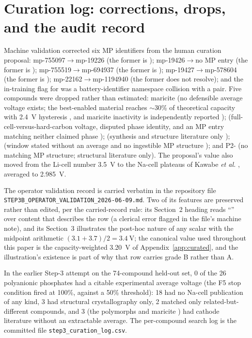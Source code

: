 \documentclass[reprint,aps,prb,amsmath,amssymb,nofootinbib,longbibliography]{revtex4-2}
\begin{document}
\section{Curation log: corrections, drops, and the audit record}
\label{app:curation}

Machine validation corrected six MP identifiers from the human curation
proposal:  mp-755097$\to$mp-19226 (the former is
);  mp-19426$\to$no MP entry (the former is
);  mp-755519$\to$mp-694937 (the former is
);  mp-19427$\to$mp-578604 (the former is
);  mp-22162$\to$mp-1194940 (the former does
not resolve); and the in-training flag for  was a
battery-identifier namespace collision with a  pair. Five
compounds were dropped rather than estimated: maricite  (no
defensible average voltage exists; the best-enabled material reaches
$\sim$30\% of theoretical capacity with \SI{2.4}{\volt} hysteresis
\cite{mohsin2023}, and maricite inactivity is independently reported
\cite{chiring2021});  (full-cell-versus-hard-carbon voltage,
disputed phase identity, and an MP entry matching neither claimed phase
\cite{barker2003});  (synthesis and structure literature only
\cite{tripathi2010});  (window stated without an
average and no ingestible MP structure \cite{komaba2012}); and
P2- (no matching MP structure; structural literature
only). The proposal's  value also moved from the Li-cell
number \SI{3.5}{\volt} \cite{ellis2007} to the Na-cell plateaus of Kawabe
\emph{et al.} \cite{kawabe2011}, averaged to \SI{2.985}{\volt}.

The operator validation record is carried verbatim in the repository file
\texttt{STEP3B\_OPERATOR\_VALIDATION\_2026-06-09.md}. Two of its features
are preserved rather than edited, per the carried-record rule: its Section~2
heading reads ``'' over content that describes the
 row (a clerical error flagged in the file's machine note),
and its Section~3 illustrates the post-hoc nature of any  scalar
with the midpoint arithmetic $(3.1+3.7)/2=\SI{3.4}{\volt}$; the canonical
value used throughout this paper is the capacity-weighted \SI{3.20}{\volt}
of Appendix~\ref{app:curated}, and the illustration's existence is part of
why that row carries grade B rather than A.

In the earlier Step-3 attempt on the 74-compound held-out set, 0 of the 26
polyanionic phosphates had a citable experimental average voltage (the F5
stop condition fired at 100\%, against a 50\% threshold): 18 had no Na-cell
publication of any kind, 3 had structural crystallography only, 2 matched
only related-but-different compounds, and 3 (the  polymorphs and
maricite ) had cathode literature without an extractable
average. The per-compound search log is the committed file
\texttt{step3\_curation\_log.csv}.
\end{document}

